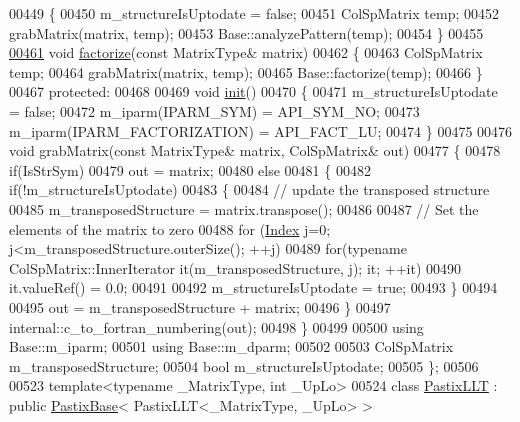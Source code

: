 \begin{DoxyCode}
00449     \{
00450       m\_structureIsUptodate = \textcolor{keyword}{false};
00451       ColSpMatrix temp;
00452       grabMatrix(matrix, temp);
00453       Base::analyzePattern(temp);
00454     \}
00455 
\hyperlink{class_eigen_1_1_pastix_l_u_ac178a87b499a2210a402787fbfd98f26}{00461}     \textcolor{keywordtype}{void} \hyperlink{class_eigen_1_1_pastix_l_u_ac178a87b499a2210a402787fbfd98f26}{factorize}(\textcolor{keyword}{const} MatrixType& matrix)
00462     \{
00463       ColSpMatrix temp;
00464       grabMatrix(matrix, temp);
00465       Base::factorize(temp);
00466     \}
00467   \textcolor{keyword}{protected}:
00468     
00469     \textcolor{keywordtype}{void} \hyperlink{structinit}{init}()
00470     \{
00471       m\_structureIsUptodate = \textcolor{keyword}{false};
00472       m\_iparm(IPARM\_SYM) = API\_SYM\_NO;
00473       m\_iparm(IPARM\_FACTORIZATION) = API\_FACT\_LU;
00474     \}
00475     
00476     \textcolor{keywordtype}{void} grabMatrix(\textcolor{keyword}{const} MatrixType& matrix, ColSpMatrix& out)
00477     \{
00478       \textcolor{keywordflow}{if}(IsStrSym)
00479         out = matrix;
00480       \textcolor{keywordflow}{else}
00481       \{
00482         \textcolor{keywordflow}{if}(!m\_structureIsUptodate)
00483         \{
00484           \textcolor{comment}{// update the transposed structure}
00485           m\_transposedStructure = matrix.transpose();
00486           
00487           \textcolor{comment}{// Set the elements of the matrix to zero }
00488           \textcolor{keywordflow}{for} (\hyperlink{namespace_eigen_a62e77e0933482dafde8fe197d9a2cfde}{Index} j=0; j<m\_transposedStructure.outerSize(); ++j) 
00489             \textcolor{keywordflow}{for}(\textcolor{keyword}{typename} ColSpMatrix::InnerIterator it(m\_transposedStructure, j); it; ++it)
00490               it.valueRef() = 0.0;
00491 
00492           m\_structureIsUptodate = \textcolor{keyword}{true};
00493         \}
00494         
00495         out = m\_transposedStructure + matrix;
00496       \}
00497       internal::c\_to\_fortran\_numbering(out);
00498     \}
00499     
00500     \textcolor{keyword}{using} Base::m\_iparm;
00501     \textcolor{keyword}{using} Base::m\_dparm;
00502     
00503     ColSpMatrix m\_transposedStructure;
00504     \textcolor{keywordtype}{bool} m\_structureIsUptodate;
00505 \};
00506 
00523 \textcolor{keyword}{template}<\textcolor{keyword}{typename} \_MatrixType, \textcolor{keywordtype}{int} \_UpLo>
00524 \textcolor{keyword}{class }\hyperlink{class_eigen_1_1_pastix_l_l_t}{PastixLLT} : \textcolor{keyword}{public} \hyperlink{class_eigen_1_1_pastix_base}{PastixBase}< PastixLLT<\_MatrixType, \_UpLo> >

\end{DoxyCode}
